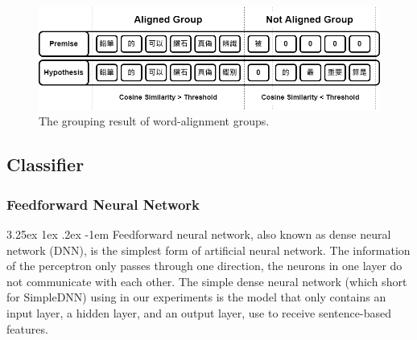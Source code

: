 \documentclass[12pt]{article}
\makeatletter
\renewcommand\paragraph{\@startsection{paragraph}{5}{\z@}%
  {3.25ex \@plus1ex \@minus.2ex}%
  {-1em}%
  {\normalfont\normalsize\bfseries}}
\makeatother
\begin{document}
\begin{CJK*}{UTF8}{bkai}
\begin{spacing}{1.77}
\begin{figure}[H]
  \centering
  \includegraphics[width=\textwidth]{Groups.png}
  \caption[Grouping Result of Word-Alignment Groups]{The grouping result of word-alignment groups.}
  \label{fig:wag_groups}
\end{figure}

\subsection{Classifier}

\subsubsection{Feedforward Neural Network}
\paragraph{}
Feedforward neural network, also known as dense neural network (DNN), is the simplest form of artificial neural network. The information of the perceptron only passes through one direction, the neurons in one layer do not communicate with each other. The simple dense neural network (which short for SimpleDNN) using in our experiments is the model that only contains an input layer, a hidden layer, and an output layer, use to receive sentence-based features.


\end{spacing}
\end{CJK*}
\end{document}
